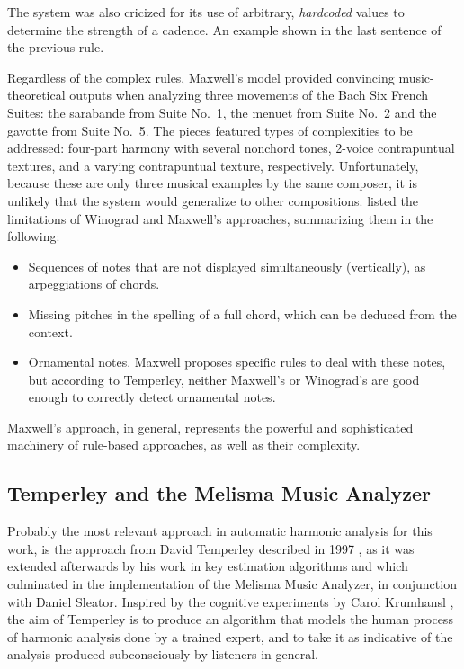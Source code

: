 The system was also cricized for its use of arbitrary,
\emph{hardcoded} values to determine the strength of a
cadence. An example shown in the last sentence of the
previous rule.

Regardless of the complex rules, Maxwell's model provided
convincing music-theoretical outputs when analyzing three
movements of the Bach Six French Suites: the sarabande from
Suite No.~1, the menuet from Suite No.~2 and the gavotte
from Suite No.~5. The pieces featured types of complexities
to be addressed: four-part harmony with several nonchord
tones, 2-voice contrapuntual textures, and a varying
contrapuntual texture, respectively. Unfortunately, because
these are only three musical examples by the same composer,
it is unlikely that the system would generalize to other
compositions. \textcite{temperley1997algorithm} listed the
limitations of Winograd and Maxwell's approaches,
summarizing them in the following:
\begin{itemize} \item Sequences of notes that are not
displayed simultaneously (vertically), as arpeggiations of
chords. \item Missing pitches in the spelling of a full
chord, which can be deduced from the context. \item
Ornamental notes. Maxwell proposes specific rules to deal
with these notes, but according to Temperley, neither
Maxwell's or Winograd's are good enough to correctly detect
ornamental notes. \end{itemize} Maxwell's approach, in
general, represents the powerful and sophisticated machinery
of rule-based approaches, as well as their complexity.



\subsection{Temperley and the Melisma Music Analyzer}
Probably the most relevant approach in automatic harmonic
analysis for this work, is the approach from David Temperley
described in 1997 \cite{temperley1997algorithm}, as it was
extended afterwards by his work in key estimation algorithms
and which culminated in the implementation of the Melisma
Music Analyzer, in conjunction with Daniel Sleator. Inspired
by the cognitive experiments by Carol Krumhansl
\cite{krumhansl2001cognitive}, the aim of Temperley is to
produce an algorithm that models the human process of
harmonic analysis done by a trained expert, and to take it
as indicative of the analysis produced subconsciously by
listeners in general.

